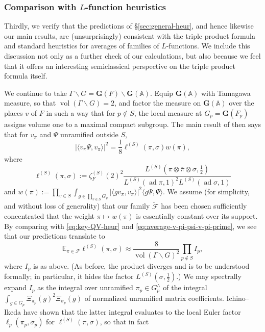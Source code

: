 \documentclass[reqno,10pt]{amsart}
\theoremstyle{plain} %
\theoremstyle{definition}
\theoremstyle{plain} %
\theoremstyle{remark}
\theoremstyle{itplain} %
\theoremstyle{remark} %
\numberwithin{equation}{section}
\DeclareMathOperator{\ad}{ad}
\DeclareMathOperator{\vol}{vol}
\begin{document}
\subsubsection{Comparison with $L$-function heuristics}\label{sec:35ac3e57b1}

Thirdly, we verify that the predictions of \S\ref{sec:general-heur}, and hence likewise our main results, are (unsurprisingly) consistent with the triple product formula and standard heuristics for averages of families of $L$-functions.  We include this discussion not only as a further check of our calculations, but also because we feel that it offers an interesting semiclassical perspective on the triple product formula itself.

We continue to take $\Gamma \backslash G = \mathbf{G}(F) \backslash \mathbf{G}(\mathbb{A})$.  Equip $\mathbf{G}(\mathbb{A})$ with Tamagawa measure, so that $\vol(\Gamma \backslash G) = 2$, and factor the measure on $\mathbf{G}(\mathbb{A})$ over the places $v$ of $F$ in such a way that for $p \notin S$, the local measure at $G_p = \mathbf{G}(F_p)$ assigns volume one to a maximal compact subgroup.  The main result of \cite{MR2449948} then says that for $v_\pi$ and $\Psi$ unramified outside $S$,
\[
  \lvert \langle v_\pi \Psi, v_\pi \rangle \rvert^2 = \frac{1}{8} \ell^{(S)}(\pi,\sigma) w(\pi),
\]
where
\[
  \ell^{(S)}(\pi,\sigma) := \zeta_F^{(S)}(2)^2 \frac{L^{(S)}(\pi \otimes \overline{\pi } \otimes \sigma, \tfrac{1}{2})}{ L^{(S)}(\ad \pi,1)^2 L^{(S)}(\ad \sigma,1)}
\]
and $w(\pi) := \prod_{v \in S} \int_{g \in \prod_{v \in S} G_v} \left\lvert \langle g v_\pi, v_\pi \rangle \right\rvert^2 \langle g \Psi, \Psi \rangle$.  We assume (for simplicity, and without loss of generality) that our family $\tilde{\mathcal{F}}$ has been chosen sufficiently concentrated that the weight $\pi \mapsto w(\pi)$ is essentially constant over its support.  By comparing with \eqref{eq:key-QV-heur} and \eqref{eq:average-v-pi-psi-v-pi-prime}, we see that our predictions translate to
\begin{equation*}
  \mathbb{E}_{\pi \in \mathcal{F}}
  \ell^{(S)}(\pi,\sigma)
  \approx
  \frac{8}{\vol(\Gamma \backslash G)^2}
  \prod_{p \notin S} I_p,
\end{equation*}
where $I_p$ is as above.  (As before, the product diverges and is to be understood formally; in particular, it hides the factor $L^{(S)}(\sigma,\tfrac{1}{2} )$.)  We may spectrally expand $I_p$ as the integral over unramified $\pi_p \in G_p^\wedge$ of the integral $\int_{g \in G_p} \Xi_{\pi_p}(g)^2 \Xi_{\sigma_p}(g)$ of normalized unramified matrix coefficients.  Ichino--Ikeda \cite[Theorem 1.2]{MR2585578} have shown that the latter integral evaluates to the local Euler factor $\ell_p(\pi_p,\sigma_p)$ for $\ell^{(S)}(\pi,\sigma)$, so that in fact
\end{document}
